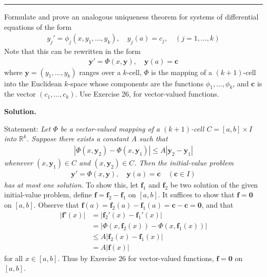 \documentclass[12pt]{article}
\theoremstyle{definition}
\begin{document}
\bigskip\noindent\hrule\bigskip

Formulate and prove an analogous uniqueness theorem for systems of differential equations of the form
\begin{align*}
y_j'=\phi_j(x,y_1,\ldots,y_k),\quad
y_j(a)=c_j,\quad
(j=1,\ldots,k)
\end{align*}
Note that this can be rewritten in the form
\begin{align*}
\mathbf{y}'=\Phi(x,\mathbf{y}),\quad\mathbf{y}(a)=\mathbf{c}
\end{align*}
where $\mathbf{y}=(y_1,\ldots,y_k)$ ranges over a $k$-cell, $\Phi$ is the mapping of a $(k+1)$-cell into the Euclidean $k$-space whose components are the functions $\phi_1,\ldots,\phi_k$, and $\mathbf{c}$ is the vector $(c_1,\ldots,c_k)$. Use Exercise 26, for vector-valued functions.

\smallskip
\noindent\textbf{Solution.}\quad

Statement: \textit{Let $\Phi$ be a vector-valued mapping of a $(k+1)$-cell $C=[a,b]\times I$ into $\mathbb{R}^k$. Suppose there exists a constant $A$ such that
\begin{align*}
\left\vert\Phi(x,\mathbf{y}_2)-\Phi(x,\mathbf{y}_1)\right\vert\le A\left\vert\mathbf{y}_2-\mathbf{y}_1\right\vert
\end{align*}
whenever $(x,\mathbf{y}_1)\in C$ and $(x,\mathbf{y}_2)\in C$. Then the initial-value problem
\begin{align*}
\mathbf{y}'=\Phi(x,\mathbf{y}),\quad \mathbf{y}(a)=\mathbf{c}\quad(\mathbf{c}\in I)
\end{align*}
has at most one solution.}
To show this, let $\mathbf{f}_1$ and $\mathbf{f}_2$ be two solution of the given initial-value problem, define $\mathbf{f}=\mathbf{f}_2-\mathbf{f}_1$ on $[a,b]$. It suffices to show that $\mathbf{f}=\mathbf{0}$ on $[a,b]$. Observe that $\mathbf{f}(a)=\mathbf{f}_2(a)-\mathbf{f}_1(a)=\mathbf{c}-\mathbf{c}=\mathbf{0}$, and that
\begin{align*}
\left\vert \mathbf{f}'(x)\right\vert
&=\left\vert \mathbf{f}_2'(x)-\mathbf{f}_1'(x)\right\vert \\
&=\left\vert \Phi(x,\mathbf{f}_2(x))-\Phi(x,\mathbf{f}_1(x))\right\vert \\
&\le A\left\vert \mathbf{f}_2(x)-\mathbf{f}_1(x)\right\vert \\
&=A\left\vert \mathbf{f}(x)\right\vert
\end{align*}
for all $x\in[a,b]$. Thus by Exercise 26 for vector-valued functions, $\mathbf{f}=\mathbf{0}$ on $[a,b]$.
\end{document}
